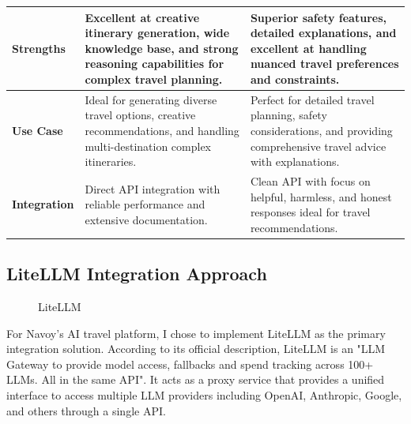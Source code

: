 \begin{longtable}{| p{} | p{} | p{} |}
    \hline
    \endlastfoot

    \textbf{Strengths}                   & Excellent at creative itinerary generation, wide knowledge base, and strong reasoning capabilities for complex travel planning. & Superior safety features, detailed explanations, and excellent at handling nuanced travel preferences and constraints.    \\
    \hline
    \textbf{Use Case}                    & Ideal for generating diverse travel options, creative recommendations, and handling multi-destination complex itineraries.      & Perfect for detailed travel planning, safety considerations, and providing comprehensive travel advice with explanations. \\
    \hline
    \textbf{Integration}                 & Direct API integration with reliable performance and extensive documentation.                                                   & Clean API with focus on helpful, harmless, and honest responses ideal for travel recommendations.                         \\
    \hline
\end{longtable}

\subsection{LiteLLM Integration Approach}
\begin{figure}[H]
    \centering
    \caption{LiteLLM}
    \label{fig:litellm}
\end{figure}

For Navoy's AI travel platform, I chose to implement LiteLLM as the primary integration solution. According to its official description, LiteLLM is an "LLM Gateway to provide model access, fallbacks and spend tracking across 100+ LLMs. All in the same API"\cite{litellm}. It acts as a proxy service that provides a unified interface to access multiple LLM providers including OpenAI, Anthropic, Google, and others through a single API.

